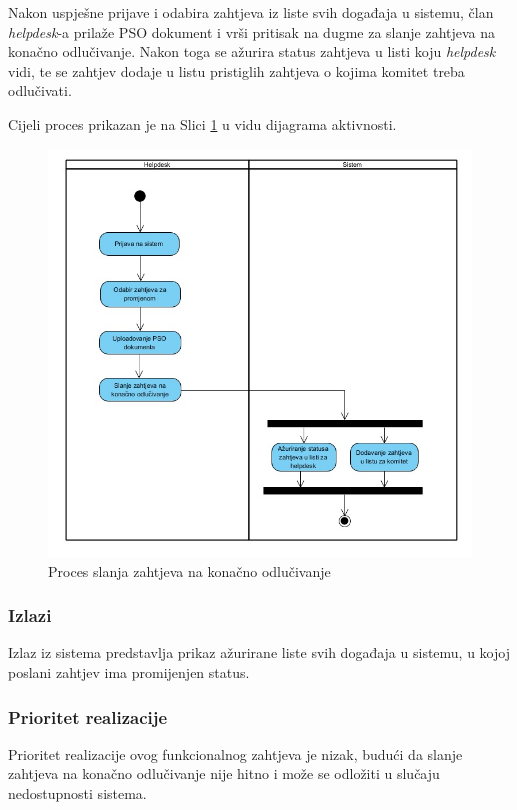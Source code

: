 \documentclass[12pt,a4paper]{article}
\begin{document}
Nakon uspješne prijave i odabira zahtjeva iz liste svih događaja u sistemu, član \textit{helpdesk}-a prilaže PSO dokument i vrši pritisak na dugme za slanje zahtjeva na konačno odlučivanje. Nakon toga se ažurira status zahtjeva u listi koju \textit{helpdesk} vidi, te se zahtjev dodaje u listu pristiglih zahtjeva o kojima komitet treba odlučivati.

Cijeli proces prikazan je na Slici \ref{act10} u vidu dijagrama aktivnosti.

\begin{figure}[H]
\center
\includegraphics[scale=0.5]{../res/Activity/activity10.JPG}
\caption{Proces slanja zahtjeva na konačno odlučivanje}
\label{act10}
\end{figure}

\subsubsection{Izlazi}

Izlaz iz sistema predstavlja prikaz ažurirane liste svih događaja u sistemu, u kojoj poslani zahtjev ima promijenjen status.

\subsubsection{Prioritet realizacije}

Prioritet realizacije ovog funkcionalnog zahtjeva je nizak, budući da slanje zahtjeva na konačno odlučivanje nije hitno i može se odložiti u slučaju nedostupnosti sistema.
\end{document}
